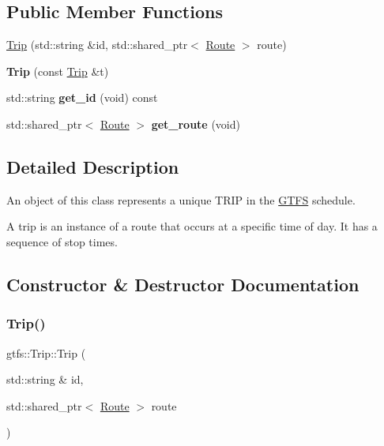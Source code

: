 \subsection*{Public Member Functions}
\begin{DoxyCompactItemize}
\item 
\hyperlink{classgtfs_1_1Trip_a3014ee32fdb5abd550ad20088c91aae6}{Trip} (std\+::string \&id, std\+::shared\+\_\+ptr$<$ \hyperlink{classgtfs_1_1Route}{Route} $>$ route)
\item 
\mbox{\label{classgtfs_1_1Trip_adb48f29b83c759f5a9242b6cf42c2ff6}} 
{\bfseries Trip} (const \hyperlink{classgtfs_1_1Trip}{Trip} \&t)
\item 
\mbox{\label{classgtfs_1_1Trip_ac4c80cbf34f7c715104cc1c33b082f58}} 
std\+::string {\bfseries get\+\_\+id} (void) const
\item 
\mbox{\label{classgtfs_1_1Trip_a2b6cc135946d7e7db7bb35951987e35c}} 
std\+::shared\+\_\+ptr$<$ \hyperlink{classgtfs_1_1Route}{Route} $>$ {\bfseries get\+\_\+route} (void)
\end{DoxyCompactItemize}


\subsection{Detailed Description}
An object of this class represents a unique T\+R\+IP in the \hyperlink{classgtfs_1_1GTFS}{G\+T\+FS} schedule.

A trip is an instance of a route that occurs at a specific time of day. It has a sequence of stop times. 

\subsection{Constructor \& Destructor Documentation}
\mbox{\label{classgtfs_1_1Trip_a3014ee32fdb5abd550ad20088c91aae6}} 
\subsubsection{\texorpdfstring{Trip()}{Trip()}}
{\footnotesize\ttfamily gtfs\+::\+Trip\+::\+Trip (\begin{DoxyParamCaption}\item[{std\+::string \&}]{id,  }\item[{std\+::shared\+\_\+ptr$<$ \hyperlink{classgtfs_1_1Route}{Route} $>$}]{route }\end{DoxyParamCaption})}

